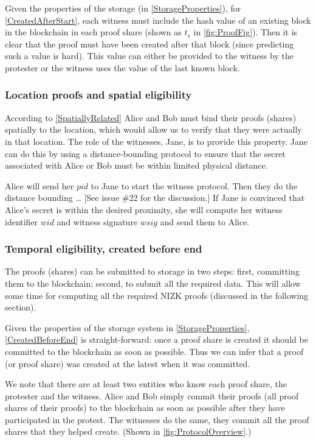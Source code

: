 Given the properties of the storage (in \cref{StorageProperties}), for 
\cref{CreatedAfterStart}, each witness must include the hash value of an 
existing block in the blockchain in each proof share (shown as \(t_s\) in 
\cref{fig:ProofFig}).
Then it is clear that the proof must have been created after that block (since 
predicting such a value is hard).
This value can either be provided to the witness by the protester or the witness 
uses the value of the last known block.

\subsubsection{Location proofs and spatial eligibility}

According to \cref{SpatiallyRelated} Alice and Bob must bind their proofs 
(shares) spatially to the location, which would allow us to verify that they 
were actually in that location.
The role of the witnesses, \eg Jane, is to provide this property.
Jane can do this by using a distance-bounding protocol to ensure that the secret 
associated with Alice or Bob must be within limited physical distance.

Alice will send her \(pid\) to Jane to start the witness protocol.
Then they do the distance bounding \dots
[See issue \#22 for the discussion.]
If Jane is convinced that Alice's secret is within the desired proximity, she 
will compute her witness identifier \(wid\) and witness signature \(wsig\) and 
send them to Alice.

\subsubsection{Temporal eligibility, created before end}

The proofs (shares) can be submitted to storage in two steps:
first, committing them to the blockchain; second, to submit all the required 
data.
This will allow some time for computing all the required \ac{NIZK} proofs 
(discussed in the following section).

Given the properties of the storage system in \cref{StorageProperties}, 
\cref{CreatedBeforeEnd} is straight-forward: once a proof share is created it 
should be committed to the blockchain as soon as possible.
Thus we can infer that a proof (or proof share) was created at the latest when 
it was committed.

We note that there are at least two entities who know each proof share, the 
protester and the witness.
Alice and Bob simply commit their proofs (\ie all proof shares of their 
proofs) to the blockchain as soon as possible after they have participated in 
the protest.
The witnesses do the same, they commit all the proof shares that they helped 
create.
(Shown in \cref{fig:ProtocolOverview}.)

